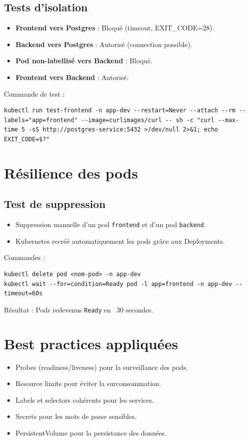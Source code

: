 \documentclass[11pt,a4paper,oneside]{report}
\begin{document}
\subsection{Tests d'isolation}
\begin{itemize}
\item \textbf{Frontend vers Postgres} : Bloqué (timeout, EXIT\_CODE=28).
\item \textbf{Backend vers Postgres} : Autorisé (connection possible).
\item \textbf{Pod non-labellisé vers Backend} : Bloqué.
\item \textbf{Frontend vers Backend} : Autorisé.
\end{itemize}

Commande de test :
\begin{lstlisting}
kubectl run test-frontend -n app-dev --restart=Never --attach --rm --labels="app=frontend" --image=curlimages/curl -- sh -c "curl --max-time 5 -sS http://postgres-service:5432 >/dev/null 2>&1; echo EXIT_CODE=$?"
\end{lstlisting}

\section{Résilience des pods}
\subsection{Test de suppression}
\begin{itemize}
\item Suppression manuelle d'un pod \texttt{frontend} et d'un pod \texttt{backend}.
\item Kubernetes recréé automatiquement les pods grâce aux Deployments.
\end{itemize}

Commandes :
\begin{lstlisting}
kubectl delete pod <nom-pod> -n app-dev
kubectl wait --for=condition=Ready pod -l app=frontend -n app-dev --timeout=60s
\end{lstlisting}

Résultat : Pods redevenus \texttt{Ready} en ~30 secondes.

\section{Best practices appliquées}
\begin{itemize}
\item Probes (readiness/liveness) pour la surveillance des pods.
\item Resource limits pour éviter la surconsommation.
\item Labels et selectors cohérents pour les services.
\item Secrets pour les mots de passe sensibles.
\item PersistentVolume pour la persistance des données.
\end{itemize}
\end{document}
